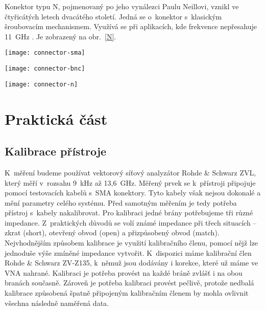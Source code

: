 \documentclass{protokol}
\begin{document}
Konektor typu N, pojmenovaný po jeho vynálezci Paulu Neillovi,
vznikl ve čtyřicátých letech dvacátého století.
Jedná se o~konektor s~klasickým šroubovacím mechanismem.
Využívá se při aplikacích, kde frekvence nepřesahuje 11~GHz \cite{rfhandbook}.
Je zobrazený na obr.~\ref{N}.

\begin{center}
	\captionsetup{justification=centering}
	\begin{minipage}{0.32\textwidth}
		\texttt{[image: connector-sma]}
		\label{SMA}
	\end{minipage}
	\begin{minipage}{0.40\linewidth}
		\texttt{[image: connector-bnc]}
		\label{BNC}
	\end{minipage}
	\begin{minipage}{0.29\textwidth}
		\texttt{[image: connector-n]}
		\label{N}
	\end{minipage}
\end{center}

\section{Praktická část}
\subsection{Kalibrace přístroje}
K~měření budeme používat vektorový síťový analyzátor Rohde \& Schwarz ZVL,
který měří v~rozsahu 9~kHz až 13,6~GHz.
Měřený prvek se k~přístroji připojuje pomocí testovacích kabelů s~SMA konektory.
Tyto kabely však nejsou dokonalé a mění parametry celého systému.
Před samotným měřením je tedy potřeba přístroj s~kabely nakalibrovat.
Pro kalibraci jedné brány potřebujeme tři různé impedance.
Z~praktických důvodů se volí známé impedance při třech situacích -- zkrat (short),
otevřený obvod (open) a přizpůsobený obvod (match).
Nejvhodnějším způsobem kalibrace je využití kalibračního členu,
pomocí nějž lze jednoduše výše zmíněné impedance vytvořit.
K~dispozici máme kalibrační člen Rohde \& Schwarz ZV-Z135,
k~němuž jsou dodávány i korekce, které už máme ve VNA nahrané.
Kalibraci je potřeba provést na každé bráně zvlášť i na obou branách současně.
Zároveň je potřeba kalibraci provést pečlivě,
protože nedbalá kalibrace způsobená špatně připojeným kalibračním členem
by mohla ovlivnit všechna následně naměřená data.
\end{document}

